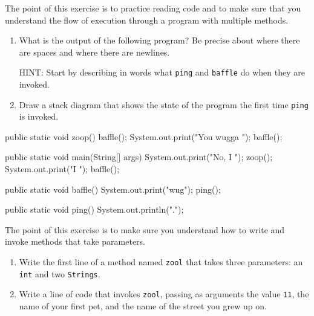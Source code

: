 \begin{exercise}

The point of this exercise is to practice reading code and to
make sure that you understand the flow of execution through
a program with multiple methods.

\begin{enumerate}

\item What is the output of the following program?  Be precise
about where there are spaces and where there are newlines.

HINT: Start by describing in words what {\tt ping} and
{\tt baffle} do when they are invoked.

\item Draw a stack diagram that shows the state of the program
the first time {\tt ping} is invoked.

\end{enumerate}

\begin{code}
  public static void zoop() {
    baffle();
    System.out.print("You wugga ");
    baffle();
  }

  public static void main(String[] args) {
    System.out.print("No, I ");
    zoop();
    System.out.print("I ");
    baffle();
  }

  public static void baffle() {
    System.out.print("wug");
    ping();
  }

  public static void ping() {
    System.out.println(".");
  }
\end{code}

\end{exercise}


\begin{exercise}

The point of this exercise is to make sure you understand how
to write and invoke methods that take parameters.

\begin{enumerate}

\item Write the first line of a method named {\tt zool} that
takes three parameters: an {\tt int} and two {\tt Strings}.

\item Write a line of code that invokes {\tt zool}, passing
as arguments the value {\tt 11}, the name of your first pet,
and the name of the street you grew up on.
\end{enumerate}

\end{exercise}



